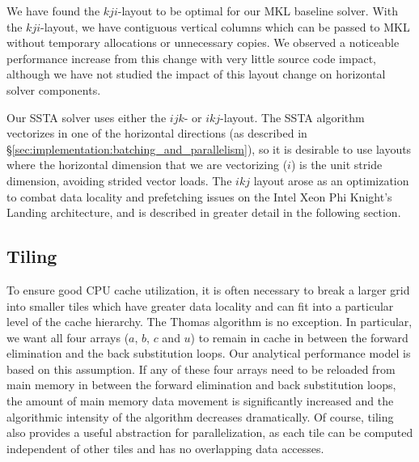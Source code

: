 \documentclass{sig-alternate-05-2015}
\begin{document}
We have found the \(kji\)-layout to be optimal for our MKL baseline solver.
With the \(kji\)-layout, we have contiguous vertical columns which can be
  passed to MKL without temporary allocations or unnecessary copies.
We observed a noticeable performance increase from this change with very
  little source code impact, although we have not studied the impact of this
  layout change on horizontal solver components.


Our SSTA solver uses either the \(ijk\)- or \(ikj\)-layout.
The SSTA algorithm vectorizes in one of the horizontal directions (as described
  in \S\ref{sec:implementation:batching_and_parallelism}), so it is desirable to
  use layouts where the horizontal dimension that we are vectorizing (\(i\)) is
  the unit stride dimension, avoiding strided vector loads.
The \(ikj\) layout arose as an optimization to combat data locality and prefetching
  issues on the Intel Xeon Phi Knight's Landing architecture, and is described in greater
  detail in the following section.

\subsection{Tiling}
\label{sec:implementation:tiling}

To ensure good CPU cache utilization, it is often necessary to break a larger
grid into smaller tiles which have greater data locality and can fit into a
particular level of the cache hierarchy. The Thomas algorithm is no exception.
In particular, we want all four arrays (\(a\), \(b\), \(c\) and \(u\)) to
remain in cache in between the forward elimination and the back substitution
loops. Our analytical performance model is based on this assumption. If any of
these four arrays need to be reloaded from main memory in between the forward
elimination and back substitution loops, the amount of main memory data
movement is significantly increased and the algorithmic intensity of the
algorithm decreases dramatically. Of course, tiling also provides a useful
abstraction for parallelization, as each tile can be computed independent of
other tiles and has no overlapping data accesses.
\end{document}
